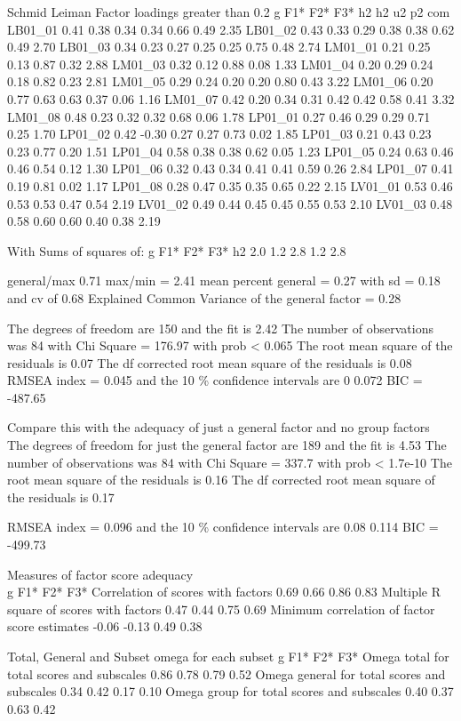 \documentclass[
  man]{apa6}
\begin{document}
Schmid Leiman Factor loadings greater than 0.2
g F1* F2* F3* h2 h2 u2 p2 com
LB01\_01 0.41 0.38 0.34 0.34 0.66 0.49 2.35
LB01\_02 0.43 0.33 0.29 0.38 0.38 0.62 0.49 2.70
LB01\_03 0.34 0.23 0.27 0.25 0.25 0.75 0.48 2.74
LM01\_01 0.21 0.25 0.13 0.87 0.32 2.88
LM01\_03 0.32 0.12 0.88 0.08 1.33
LM01\_04 0.20 0.29 0.24 0.18 0.82 0.23 2.81
LM01\_05 0.29 0.24 0.20 0.20 0.80 0.43 3.22
LM01\_06 0.20 0.77 0.63 0.63 0.37 0.06 1.16
LM01\_07 0.42 0.20 0.34 0.31 0.42 0.42 0.58 0.41 3.32
LM01\_08 0.48 0.23 0.32 0.32 0.68 0.06 1.78
LP01\_01 0.27 0.46 0.29 0.29 0.71 0.25 1.70
LP01\_02 0.42 -0.30 0.27 0.27 0.73 0.02 1.85
LP01\_03 0.21 0.43 0.23 0.23 0.77 0.20 1.51
LP01\_04 0.58 0.38 0.38 0.62 0.05 1.23
LP01\_05 0.24 0.63 0.46 0.46 0.54 0.12 1.30
LP01\_06 0.32 0.43 0.34 0.41 0.41 0.59 0.26 2.84
LP01\_07 0.41 0.19 0.81 0.02 1.17
LP01\_08 0.28 0.47 0.35 0.35 0.65 0.22 2.15
LV01\_01 0.53 0.46 0.53 0.53 0.47 0.54 2.19
LV01\_02 0.49 0.44 0.45 0.45 0.55 0.53 2.10
LV01\_03 0.48 0.58 0.60 0.60 0.40 0.38 2.19

With Sums of squares of:
g F1* F2* F3* h2
2.0 1.2 2.8 1.2 2.8

general/max 0.71 max/min = 2.41
mean percent general = 0.27 with sd = 0.18 and cv of 0.68
Explained Common Variance of the general factor = 0.28

The degrees of freedom are 150 and the fit is 2.42
The number of observations was 84 with Chi Square = 176.97 with prob \textless{} 0.065
The root mean square of the residuals is 0.07
The df corrected root mean square of the residuals is 0.08
RMSEA index = 0.045 and the 10 \% confidence intervals are 0 0.072
BIC = -487.65

Compare this with the adequacy of just a general factor and no group factors
The degrees of freedom for just the general factor are 189 and the fit is 4.53
The number of observations was 84 with Chi Square = 337.7 with prob \textless{} 1.7e-10
The root mean square of the residuals is 0.16
The df corrected root mean square of the residuals is 0.17

RMSEA index = 0.096 and the 10 \% confidence intervals are 0.08 0.114
BIC = -499.73

Measures of factor score adequacy\\
g F1* F2* F3*
Correlation of scores with factors 0.69 0.66 0.86 0.83
Multiple R square of scores with factors 0.47 0.44 0.75 0.69
Minimum correlation of factor score estimates -0.06 -0.13 0.49 0.38

Total, General and Subset omega for each subset
g F1* F2* F3*
Omega total for total scores and subscales 0.86 0.78 0.79 0.52
Omega general for total scores and subscales 0.34 0.42 0.17 0.10
Omega group for total scores and subscales 0.40 0.37 0.63 0.42
\end{document}
